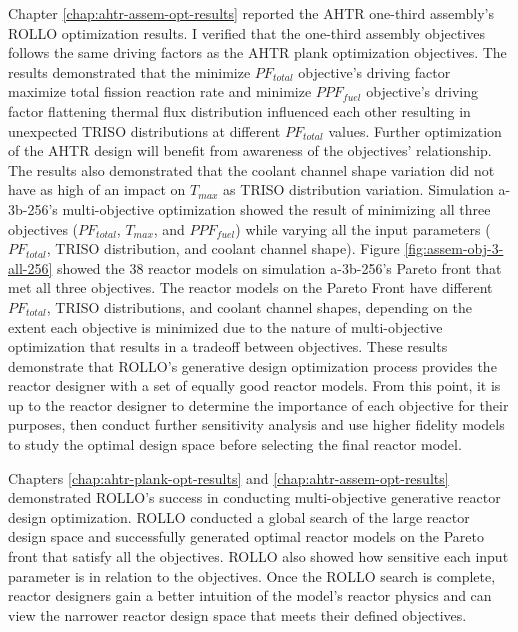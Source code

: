 Chapter \ref{chap:ahtr-assem-opt-results} reported the \gls{AHTR} one-third assembly's
\gls{ROLLO} optimization results.
I verified that the one-third assembly objectives follows the same driving 
factors as the \gls{AHTR} plank optimization objectives. 
The results demonstrated that the minimize $PF_{total}$ objective's driving factor 
maximize total fission reaction rate and minimize $PPF_{fuel}$ objective's driving 
factor flattening thermal flux distribution influenced each other resulting in unexpected 
TRISO distributions at different $PF_{total}$ values. 
Further optimization of the \gls{AHTR} design will benefit from awareness 
of the objectives' relationship. 
The results also demonstrated that the coolant channel shape variation did 
not have as high of an impact on $T_{max}$ as \gls{TRISO} distribution variation.
Simulation a-3b-256's multi-objective optimization showed the result of minimizing all 
three objectives ($PF_{total}$, $T_{max}$, and $PPF_{fuel}$) while varying 
all the input parameters ($PF_{total}$, TRISO distribution, and coolant channel shape).
Figure \ref{fig:assem-obj-3-all-256} showed the 38 reactor models on simulation 
a-3b-256's Pareto front that met all three objectives. 
The reactor models on the Pareto Front have different $PF_{total}$, TRISO distributions, 
and coolant channel shapes, depending on the extent each objective is minimized due 
to the nature of multi-objective optimization that results in a tradeoff between 
objectives. 
These results demonstrate that \gls{ROLLO}'s generative design optimization process 
provides the reactor designer with a set of equally good reactor models.
From this point, it is up to the reactor designer to determine the importance of each 
objective for their purposes, then conduct further sensitivity analysis and 
use higher fidelity models to study the optimal design space before selecting 
the final reactor model.

Chapters \ref{chap:ahtr-plank-opt-results} and \ref{chap:ahtr-assem-opt-results} 
demonstrated \gls{ROLLO}'s success in conducting multi-objective generative reactor 
design optimization. 
\gls{ROLLO} conducted a global search of the large reactor design space and successfully 
generated optimal reactor models on the Pareto front that satisfy all the objectives. 
\gls{ROLLO} also showed how sensitive each input parameter is in relation to 
the objectives. 
Once the \gls{ROLLO} search is complete, reactor designers gain a better intuition of 
the model's reactor physics and can view the narrower reactor design space that meets 
their defined objectives.   

